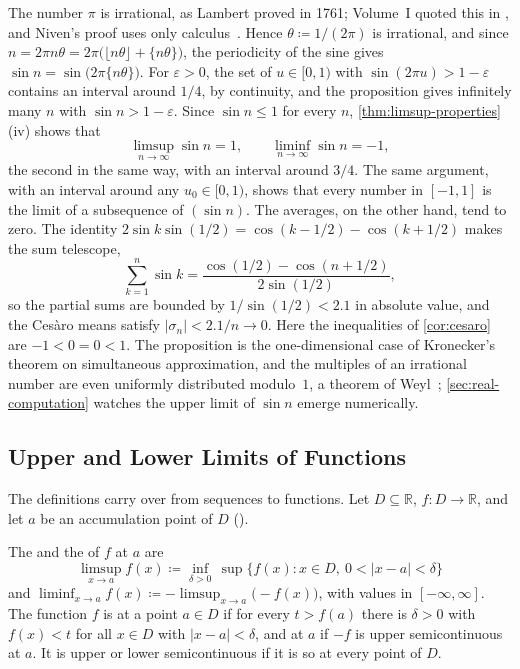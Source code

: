 The number $\pi$ is irrational, as Lambert proved in 1761; Volume~I quoted this in , and Niven's proof uses only calculus~\cite{lambert1768,niven1947}. Hence $\theta\coloneqq1/(2\pi)$ is irrational, and since $n=2\pi n\theta=2\pi\bigl(\lfloor n\theta\rfloor+\{n\theta\}\bigr)$, the periodicity of the sine gives $\sin n=\sin\bigl(2\pi\{n\theta\}\bigr)$. For $\varepsilon>0$, the set of $u\in[0,1)$ with $\sin(2\pi u)>1-\varepsilon$ contains an interval around $1/4$, by continuity, and the proposition gives infinitely many $n$ with $\sin n>1-\varepsilon$. Since $\sin n\le1$ for every $n$, \cref{thm:limsup-properties}\,(iv) shows that
\[
\limsup_{n\to\infty}\sin n=1,\qquad\liminf_{n\to\infty}\sin n=-1,
\]
the second in the same way, with an interval around $3/4$. The same argument, with an interval around any $u_0\in[0,1)$, shows that every number in $[-1,1]$ is the limit of a subsequence of $(\sin n)$. The averages, on the other hand, tend to zero. The identity $2\sin k\sin(1/2)=\cos(k-1/2)-\cos(k+1/2)$ makes the sum telescope,
\[
\sum_{k=1}^n\sin k=\frac{\cos(1/2)-\cos(n+1/2)}{2\sin(1/2)},
\]
so the partial sums are bounded by $1/\sin(1/2)<2.1$ in absolute value, and the Ces\`aro means satisfy $|\sigma_n|<2.1/n\to0$. Here the inequalities of \cref{cor:cesaro} are $-1<0=0<1$. The proposition is the one-dimensional case of Kronecker's theorem on simultaneous approximation, and the multiples of an irrational number are even uniformly distributed modulo~$1$, a theorem of Weyl~\cite{hardywright2008}; \cref{sec:real-computation} watches the upper limit of $\sin n$ emerge numerically.

\subsection{Upper and Lower Limits of Functions}

The definitions carry over from sequences to functions. Let $D\subseteq\mathbb R$, $f\colon D\to\mathbb R$, and let $a$ be an accumulation point of $D$ ().

\begin{definition}
\label{def:semicontinuous}
The  and the  of $f$ at $a$ are
\[
\limsup_{x\to a}f(x)\coloneqq\inf_{\delta>0}\,\sup\{f(x): x\in D,\ 0<|x-a|<\delta\}
\]
and $\liminf_{x\to a}f(x)\coloneqq-\limsup_{x\to a}\bigl(-f(x)\bigr)$, with values in $[-\infty,\infty]$. The function $f$ is  at a point $a\in D$ if for every $t>f(a)$ there is $\delta>0$ with $f(x)<t$ for all $x\in D$ with $|x-a|<\delta$, and  at $a$ if $-f$ is upper semicontinuous at $a$. It is upper or lower semicontinuous if it is so at every point of $D$.
\end{definition}

